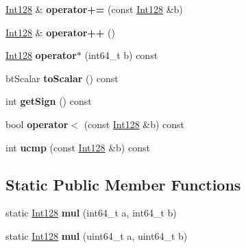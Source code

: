 \begin{DoxyCompactItemize}
\hyperlink{classbtConvexHullInternal_1_1Int128}{Int128} \& {\bfseries operator+=} (const \hyperlink{classbtConvexHullInternal_1_1Int128}{Int128} \&b)
\item 
\mbox{\label{classbtConvexHullInternal_1_1Int128_a0efbb30ee909c4ce9eb7b8c8b4cd5238}} 
\hyperlink{classbtConvexHullInternal_1_1Int128}{Int128} \& {\bfseries operator++} ()
\item 
\mbox{\label{classbtConvexHullInternal_1_1Int128_a6a9be6cfa7efd4b20ec92022da1283c3}} 
\hyperlink{classbtConvexHullInternal_1_1Int128}{Int128} {\bfseries operator$\ast$} (int64\+\_\+t b) const
\item 
\mbox{\label{classbtConvexHullInternal_1_1Int128_ab1b608e1bffb0aecaeb73858ed45e450}} 
bt\+Scalar {\bfseries to\+Scalar} () const
\item 
\mbox{\label{classbtConvexHullInternal_1_1Int128_a5838fe5711bff7447e83f59cc3833b12}} 
int {\bfseries get\+Sign} () const
\item 
\mbox{\label{classbtConvexHullInternal_1_1Int128_a7419f7848987321444705302a89720e2}} 
bool {\bfseries operator$<$} (const \hyperlink{classbtConvexHullInternal_1_1Int128}{Int128} \&b) const
\item 
\mbox{\label{classbtConvexHullInternal_1_1Int128_a12fb708b33dfbb1ec0e67d4cb40ef5cf}} 
int {\bfseries ucmp} (const \hyperlink{classbtConvexHullInternal_1_1Int128}{Int128} \&b) const
\end{DoxyCompactItemize}
\subsection*{Static Public Member Functions}
\begin{DoxyCompactItemize}
\item 
\mbox{\label{classbtConvexHullInternal_1_1Int128_ac3737330b8417809b11b94664042dc12}} 
static \hyperlink{classbtConvexHullInternal_1_1Int128}{Int128} {\bfseries mul} (int64\+\_\+t a, int64\+\_\+t b)
\item 
\mbox{\label{classbtConvexHullInternal_1_1Int128_aa62234c1a27cf8b3327413ccfde06d8a}} 
static \hyperlink{classbtConvexHullInternal_1_1Int128}{Int128} {\bfseries mul} (uint64\+\_\+t a, uint64\+\_\+t b)
\end{DoxyCompactItemize}
